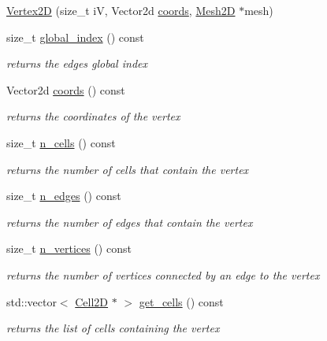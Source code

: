 \begin{DoxyCompactItemize}
\item 
\hyperlink{classHArDCore2D_1_1Vertex2D_ae759dbca494a48ef69b92822ee1a29df}{Vertex2D} (size\+\_\+t iV, Vector2d \hyperlink{group__Mesh2D_gaa4022dfbf307b635bd6e57a942ab336e}{coords}, \hyperlink{classHArDCore2D_1_1Mesh2D}{Mesh2D} $\ast$mesh)
\item 
size\+\_\+t \hyperlink{group__Mesh2D_ga916ae3bd5ae5fe6e79554ef216c72382}{global\+\_\+index} () const
\begin{DoxyCompactList}\small\item\em returns the edges global index \end{DoxyCompactList}\item 
Vector2d \hyperlink{group__Mesh2D_gaa4022dfbf307b635bd6e57a942ab336e}{coords} () const
\begin{DoxyCompactList}\small\item\em returns the coordinates of the vertex \end{DoxyCompactList}\item 
size\+\_\+t \hyperlink{group__Mesh2D_ga6404e2ae17101be9b659503633913cf0}{n\+\_\+cells} () const
\begin{DoxyCompactList}\small\item\em returns the number of cells that contain the vertex \end{DoxyCompactList}\item 
size\+\_\+t \hyperlink{group__Mesh2D_gafa640a776dbd344dfcc9fc50bba0ef9a}{n\+\_\+edges} () const
\begin{DoxyCompactList}\small\item\em returns the number of edges that contain the vertex \end{DoxyCompactList}\item 
size\+\_\+t \hyperlink{group__Mesh2D_gad7125cc3da51d21e712498a29901860b}{n\+\_\+vertices} () const
\begin{DoxyCompactList}\small\item\em returns the number of vertices connected by an edge to the vertex \end{DoxyCompactList}\item 
std\+::vector$<$ \hyperlink{classHArDCore2D_1_1Cell2D}{Cell2D} $\ast$ $>$ \hyperlink{group__Mesh2D_ga73dce5f9bfbdfda7631e04f062f2df79}{get\+\_\+cells} () const
\begin{DoxyCompactList}\small\item\em returns the list of cells containing the vertex \end{DoxyCompactList}\item 

\end{DoxyCompactItemize}
